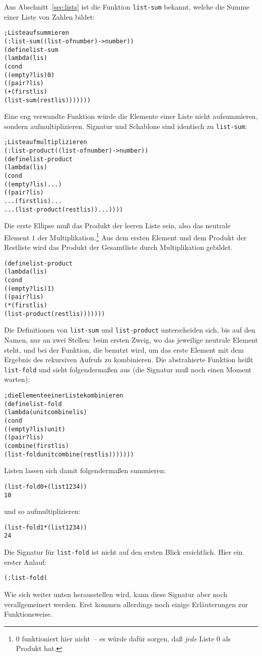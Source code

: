 Aus Abschnitt~\ref{sec:lists} ist die Funktion \texttt{list-sum}
bekannt, welche die Summe einer Liste von Zahlen bildet:
%
\begin{alltt}
; Liste aufsummieren
(: list-sum ((list-of number) -> number))
(define list-sum
  (lambda (lis)
    (cond
      ((empty? lis) 0)
      ((pair? lis) 
       (+ (first lis)
          (list-sum (rest lis)))))))
\end{alltt}
%
Eine eng verwandte Funktion würde die Elemente einer Liste nicht
aufsummieren, sondern aufmultiplizieren.   Signatur und Schablone sind
identisch zu \texttt{list-sum}:
%
\begin{alltt}
; Liste aufmultiplizieren
(: list-product ((list-of number) -> number))
(define list-product
  (lambda (lis)
    (cond
      ((empty? lis) ...)
      ((pair? lis) 
       ... (first lis) ...
       ... (list-product (rest lis)) ...))))
\end{alltt}
%
Die erste Ellipse muß das Produkt der leeren Liste sein, also das
neutrale Element $1$ der Multiplikation.\footnote{0 funktioniert
  hier nicht~-- es würde dafür sorgen,
  daß \emph{jede} Liste 0 als Produkt hat.} 
Aus dem ersten Element und dem Produkt der
Restliste wird das Produkt der Gesamtliste durch
Multiplikation gebildet.
%
\begin{alltt}
(define list-product
  (lambda (lis)
    (cond
      ((empty? lis) 1)
      ((pair? lis) 
       (* (first lis)
          (list-product (rest lis)))))))
\end{alltt}
%
Die Definitionen von \texttt{list-sum} und \texttt{list-product}
unterscheiden sich, bis auf den Namen, nur an zwei Stellen: beim ersten
Zweig, wo das jeweilige neutrale Element steht, und bei der Funktion,
die benutzt wird, um das erste Element mit dem Ergebnis des rekursiven
Aufrufs zu kombinieren.  Die abstrahierte Funktion heißt
\texttt{list-fold} und sieht folgendermaßen aus (die Signatur muß noch
einen Moment warten):
%
\begin{alltt}
; die Elemente einer Liste kombinieren
(define list-fold
  (lambda (unit combine lis)
    (cond
      ((empty? lis) unit)
      ((pair? lis) 
       (combine (first lis)
                (list-fold unit combine (rest lis)))))))
\end{alltt}
%
Listen lassen sich damit folgendermaßen summieren:
%
\begin{alltt}
(list-fold 0 + (list 1 2 3 4))
\evalsto{} 10
\end{alltt}
%
und so aufmultiplizieren:
%
\begin{alltt}
(list-fold 1 * (list 1 2 3 4))
\evalsto{} 24
\end{alltt}
%
Die Signatur für \texttt{list-fold} ist nicht auf den ersten Blick
ersichtlich.  Hier ein erster Anlauf:
%
\begin{alltt}
(: list-fold (%a (%a %a -> %a) (list-of %a) -> %a))
\end{alltt}
%
Wie sich weiter unten herausstellen wird, kann
diese Signatur aber
noch verallgemeinert werden.  Erst kommen allerdings noch einige
Erläuterungen zur Funktionsweise.

